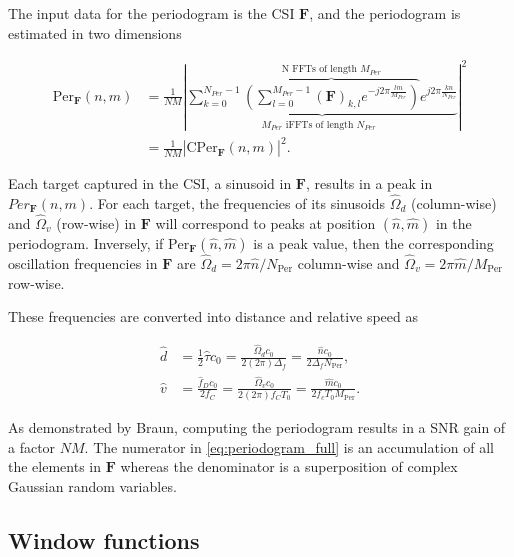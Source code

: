     The input data for the periodogram is the CSI $\bm{F}$, and the periodogram is estimated in two dimensions

    \begin{align}
        \text{Per}_{\bm{F}}(n,m) &= \frac{1}{NM} \left| \underbrace{ \sum_{k=0}^{N_{Per}-1}  \overbrace{\left(  \sum_{l=0}^{M_{Per}-1} (\bm{F})_{k,l} e^{-j2\pi \frac{lm}{M_{Per}}} \right)}^{\text{N FFTs of length $M_{Per}$}}  e^{j2\pi\frac{kn}{N_{Per}}}}_{ \text{$M_{Per}$ iFFTs of length $N_{Per}$ }} \right| ^ 2 \label{eq:periodogram_full}\\
        &= \frac{1}{NM} \left| \text{CPer}_{\bm{F}}(n,m) \right| ^ 2. \label{eq:periodogram_cper}
    \end{align}


    Each target captured in the CSI, \ie a sinusoid in $\bm{F}$, results in a peak in $Per_{\bm{F}}(n,m)$.
    For each target, the frequencies of its sinusoids $\hat{\Omega}_d$ (column-wise) and $\hat{\Omega}_v$ (row-wise) in $\bm{F}$ will correspond to peaks at position $(\hat{n}, \hat{m})$ in the periodogram. Inversely, if $\text{Per}_{\bm{F}}(\hat{n},\hat{m})$ is a peak value, then the corresponding oscillation frequencies in $\bm{F}$ are $\hat{\Omega}_d = 2\pi\hat{n}/N_{\text{Per}}$ column-wise and $\hat{\Omega}_v = 2\pi\hat{m}/M_{\text{Per}}$ row-wise.
    
    These frequencies are converted into distance and relative speed as

    \begin{align}
        \hat{d} &= \frac{1}{2}\hat{\tau}c_0 = \frac{\hat{\Omega}_d c_0}{2 (2\pi) \Delta_f} = \frac{\hat{n}c_0}{2\Delta_f N_\text{Per}}, \\
        \hat{v} &= \frac{\hat{f}_D c_0 }{2 f_C} = \frac{\hat{\Omega}_v c_0}{2(2\pi)f_CT_0} =  \frac{\hat{m}c_0}{2f_cT_0 M_{\text{Per}}}.
    \end{align}
    
    
    

    As demonstrated by Braun, computing the periodogram results in a SNR gain of a factor $NM$. The numerator in \ref{eq:periodogram_full} is an accumulation of all the elements in $\bm{F}$ whereas the denominator is a superposition of complex Gaussian random variables.
    
	\subsection{Window functions}
	
